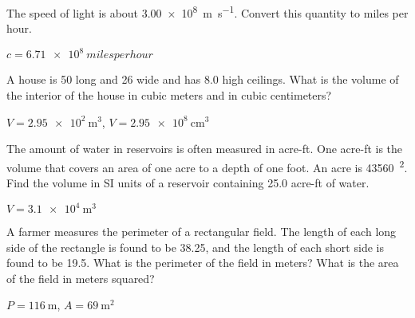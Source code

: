


\begin{question}[ID=UC01,topic=unit-conversion,difficulty=easy]
    The speed of light is about \SI{3.00e8}{\meter\per\second}.
    Convert this quantity to miles per hour. 
\end{question}
\begin{solution}
    $c = \SI{6.71e8}{miles per hour}$
\end{solution}

\begin{question}[ID=UC02,topic=unit-conversion,difficulty=easy]
    A house is \SI{50}{\foot} long and \SI{26}{\foot} wide and has
        \SI{8.0}{\foot} high ceilings.
    What is the volume of the interior of the house in cubic
        meters and in cubic centimeters? 
\end{question}
\begin{solution}
    $V = \SI{2.95e2}{\meter\cubed}$,
    $V = \SI{2.95e8}{\centi\meter\cubed}$
\end{solution}

\begin{question}[ID=UC03,topic=unit-conversion,difficulty=easy]
    The amount of water in reservoirs is often measured in acre-ft.
    One acre-ft is the volume that covers an area of one acre
        to a depth of one foot.
    An acre is \SI{43560}{\foot\squared}.
    Find the volume in SI units of a reservoir containing
        \num{25.0} acre-ft of water.
\end{question}
\begin{solution}
    $V = \SI{3.1e4}{\meter\cubed}$
\end{solution}

\begin{question}[ID=UC04,topic=unit-conversion,difficulty=easy]
    A farmer measures the perimeter of a rectangular field.
    The length of each long side of the rectangle is found
        to be \SI{38.25}{\foot}, and the length of each short
        side is found to be \SI{19.5}{\foot}.
    What is the perimeter of the field in meters?
    What is the area of the field in meters squared?
\end{question}
\begin{solution}
    $P = \SI{116}{\meter}$,
    $A = \SI{69}{\meter\squared}$
\end{solution}

